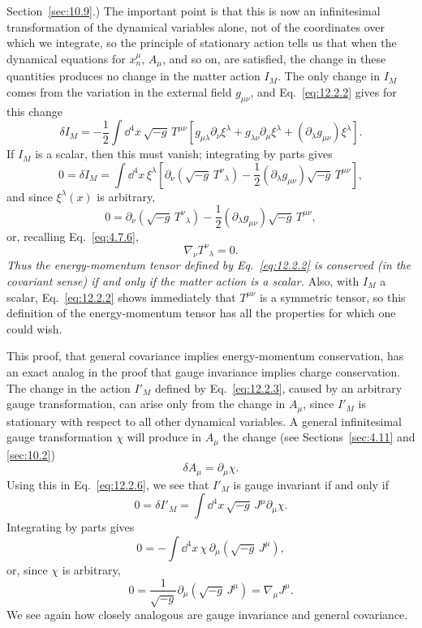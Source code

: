 Section~\ref{sec:10.9}.) The important point is that this is now an
infinitesimal transformation of the dynamical variables alone, not of the
coordinates over which we integrate, so the principle of stationary action
tells us that when the dynamical equations for \(x_n^\mu\), \(A_\mu\), and so
on, are satisfied, the change in these quantities produces no change in the
matter action \(I_M\). The only change in \(I_M\) comes from the variation in
the external field \(g_{\mu\nu}\), and Eq.~\eqref{eq:12.2.2} gives for this
change
\[
  \delta I_M
  =
  -\frac12\int\dd^4x\,\sqrt{-g}\,T^{\mu\nu}
  \left[
    g_{\mu\lambda}\partial_\nu\xi^\lambda
    +g_{\lambda\nu}\partial_\mu\xi^\lambda
    +(\partial_\lambda g_{\mu\nu})\xi^\lambda
  \right].
\]
If \(I_M\) is a scalar, then this must vanish; integrating by parts gives
\[
  0=\delta I_M
  =
  \int\dd^4x\,\xi^\lambda
  \left[
    \partial_\nu\!\left(\sqrt{-g}\,T^\nu{}_\lambda\right)
    -\frac12(\partial_\lambda g_{\mu\nu})
     \sqrt{-g}\,T^{\mu\nu}
  \right],
\]
and since \(\xi^\lambda(x)\) is arbitrary,
\[
  0
  =
  \partial_\nu\!\left(\sqrt{-g}\,T^\nu{}_\lambda\right)
  -\frac12(\partial_\lambda g_{\mu\nu})
   \sqrt{-g}\,T^{\mu\nu},
\]
or, recalling Eq.~\eqref{eq:4.7.6},
\begin{equation}
  \nabla_\nu T^\nu{}_\lambda=0.
  \tag{12.3.2}\label{eq:12.3.2}
\end{equation}
\emph{Thus the energy-momentum tensor defined by Eq.~\eqref{eq:12.2.2} is
conserved (in the covariant sense) if and only if the matter action is a
scalar.} Also, with \(I_M\) a scalar, Eq.~\eqref{eq:12.2.2} shows immediately
that \(T^{\mu\nu}\) is a symmetric tensor, so this definition of the
energy-momentum tensor has all the properties for which one could wish.

This proof, that general covariance implies energy-momentum conservation, has
an exact analog in the proof that gauge invariance implies charge
conservation. The change in the action \(I'_M\) defined by
Eq.~\eqref{eq:12.2.3}, caused by an arbitrary gauge transformation, can arise
only from the change in \(A_\mu\), since \(I'_M\) is stationary with respect
to all other dynamical variables. A general infinitesimal gauge
transformation \(\chi\) will produce in \(A_\mu\) the change (see
Sections~\ref{sec:4.11} and \ref{sec:10.2})
\[
  \delta A_\mu=\partial_\mu\chi.
\]
Using this in Eq.~\eqref{eq:12.2.6}, we see that \(I'_M\) is gauge invariant
if and only if
\[
  0=\delta I'_M
  =
  \int\dd^4x\,\sqrt{-g}\,J^\mu\partial_\mu\chi.
\]
Integrating by parts gives
\[
  0
  =
  -\int\dd^4x\,\chi\,
  \partial_\mu\!\left(\sqrt{-g}\,J^\mu\right),
\]
or, since \(\chi\) is arbitrary,
\[
  0
  =
  \frac1{\sqrt{-g}}
  \partial_\mu\!\left(\sqrt{-g}\,J^\mu\right)
  =
  \nabla_\mu J^\mu.
\]
We see again how closely analogous are gauge invariance and general
covariance.
